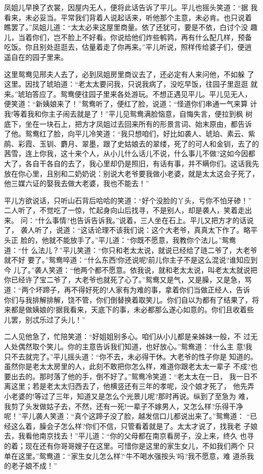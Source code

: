 凤姐儿早换了衣裳，因屋内无人，便将此话告诉了平儿。平儿也摇头笑道：“据
我看来，未必妥当。平常我们背着人说起话来，听他那个主意，未必肯。也只说着
瞧罢了。”凤姐儿道：“太太必来这屋里商量。依了还犹可，要是不依，白讨个没
趣儿，当着你们，岂不脸上不好看。你说给他们炸些鹌鹑，再有什么配几样，预备
吃饭。你且别处逛逛去，估量着走了你再来。”平儿听说，照样传给婆子们，便逍
遥自在的园子里来。

这里鸳鸯见邢夫人去了，必到凤姐房里商议去了，还必定有人来问他，不如躲
了这里。因找了琥珀道：“老太太要问我，只说我病了，没吃早饭，往园子里逛逛
就来。”琥珀答应了。鸳鸯便往园子里来各处游玩。不想正遇见平儿。平儿见无人，
便笑道：“新姨娘来了！”鸳鸯听了，便红了脸，说道：“怪道你们串通一气来算
计我!等着我和你主子闹去就是了！”平儿见鸳鸯满脸恼意，自悔失言，便拉到枫
树底下，坐在一块石上，把方才凤姐过去回来所有的形景言词、始末原由，都告诉
了他。鸳鸯红了脸，向平儿冷笑道：“我只想咱们，好比如袭人、琥珀、素云、紫
鹃、彩霞、玉钏、麝月、翠墨，跟了史姑娘去的翠缕，死了的可人和金钏，去了的
茜雪，连上你我，这十来个人，从小儿什么话儿不说，什么事儿不做?这如今因都
大了，各自干各自的去了，我心里却仍是照旧，有话有事，并不瞒你们。这话我先
放在你心里，且别和二奶奶说：别说大老爷要我做小老婆，就是太太这会子死了，
他三媒六证的娶我去做大老婆，我也不能去！”

平儿方欲说话，只听山石背后哈哈的笑道：“好个没脸的丫头，亏你不怕牙碜！”
二人听了，不觉吃了一惊，忙起身向山后找寻，不是别人，却是袭人，笑着走出来。
问：“什么事情?也告诉告诉我。”说着，三人坐在石上。平儿又把方才的话说了，
袭人听了，说道：“这话论理不该我们说：这个大老爷，真真太下作了。略平头正
脸的，他就不能放手了。”平儿道：“你既不愿意，我教你个法儿。”鸳鸯道：“什
么法儿？”平儿笑道：“你只和老太太说，就说已经给了琏二爷了，大老爷就不好
要了。”鸳鸯啐道：“什么东西!你还说呢!前儿你主子不是这么混说?谁知应到今
儿了。”袭人笑道：“他两个都不愿意。依我说，就和老太太说，叫老太太就说把
你已经许了宝二爷了，大老爷也就死了心了。”鸳鸯又是气，又是臊，又是急，骂
道：“两个坏蹄子，再不得好死的!人家有为难的事，拿着你们当做正经人，告诉
你们与我排解排解，饶不管，你们倒替换着取笑儿。你们自以为都有了结果了，将
来都是做姨娘的!据我看来，天底下的事，未必都那么遂心如意的。你们且收着些
儿罢，别忒乐过了头儿！”

二人见他急了，忙陪笑道：“好姐姐别多心。咱们从小儿都是亲姊妹一般，不
过无人处偶然取个笑儿。你的主意告诉我们知道，也好放心。”鸳鸯道：“什么主
意!我只不去就完了。”平儿摇头道：“你不去，未必得干休。大老爷的性子你是
知道的。虽然你是老太太房里的人，此刻不敢把你怎么样，难道你跟老太太一辈子
不成?也要出去的。那时落了他的手，倒不好了。”鸳鸯冷笑道：“老太太在一日，
我一日不离这里；若是老太太归西去了，他横竖还有三年的孝呢，没个娘才死了，
他先弄小老婆的!等过了三年，知道又是怎么个光景儿呢?那时再说。纵到了至急为
难，我剪了头发做姑子去，不然，还有一死!一辈子不嫁男人，又怎么样?乐得干净
呢！”平儿袭人笑道：“真个这蹄子没了脸，越发信口儿都说出来了。”鸳鸯道：
“已经这么着，臊会子怎么样?你们不信，只管看着就是了。太太才说了，找我老
子娘去，我看他南京找去！”平儿道：“你的父母都在南京看房子，没上来，终久
也寻的着；现在还有你哥哥嫂子在这里。可惜你是这里的家生女儿，不如我们两个
只单在这里。”鸳鸯道：“家生女儿怎么样?‘牛不喝水强按头’吗?我不愿意，难
道杀我的老子娘不成！”

